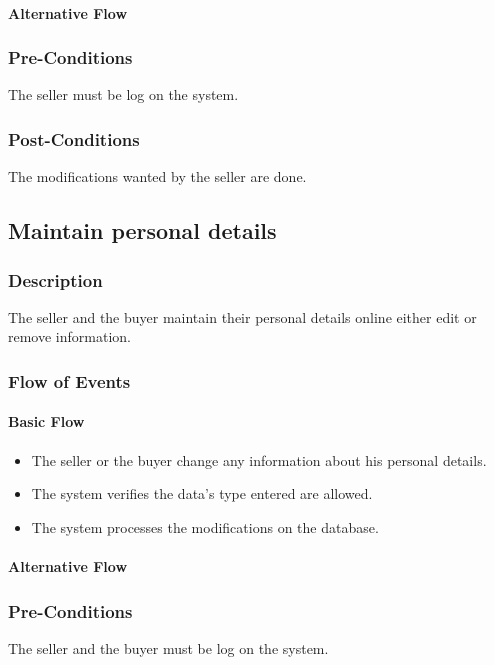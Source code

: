 \documentclass[a4paper,12pt]{article}
\begin{document}
\paragraph{Alternative Flow}
\begin{itemize}
\end{itemize}
\subsubsection{Pre-Conditions}
The seller must be log on the system.
\subsubsection{Post-Conditions}
The modifications wanted by the seller are done.

\subsection{Maintain personal details}
\subsubsection{Description}
The seller and the buyer maintain their personal details online either edit or remove information.
\subsubsection{Flow of Events}
\paragraph{Basic Flow}
\begin{itemize}
\item The seller or the buyer change any information about his personal details.
\item The system verifies the data's type entered are allowed.
\item The system processes the modifications on the database.
\end{itemize}
\paragraph{Alternative Flow}
\begin{itemize}
\end{itemize}
\subsubsection{Pre-Conditions}
The seller and the buyer must be log on the system.
\end{document}
